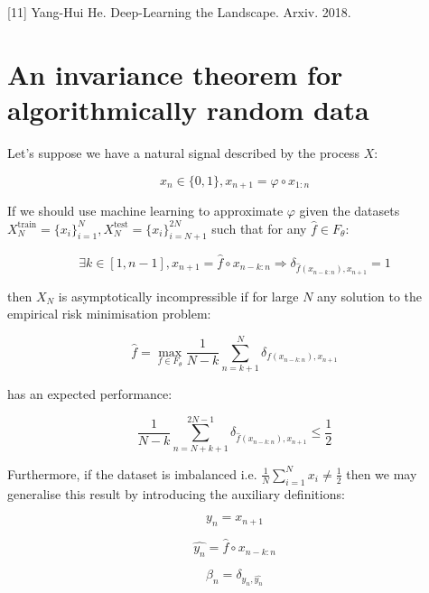 \documentclass{article}
\begin{document}
[11] Yang-Hui He. Deep-Learning the Landscape. Arxiv. 2018. 

\newpage 

\appendix

\section{An invariance theorem for algorithmically random data}

Let's suppose we have a natural signal described by the process $X$: 

\begin{equation}
x_n \in \{0,1\}, x_{n+1} = \varphi \circ x_{1:n}	
\end{equation}

If we should use machine learning to approximate $\varphi$ given the datasets 
$X_N^{\text{train}}= \{x_i\}_{i=1}^N,X_N^{\text{test}}= \{x_i\}_{i=N+1}^{2N}$
such that for any $\hat{f} \in F_{\theta}$: 

\begin{equation}
\exists k \in [1,n-1], x_{n+1} = \hat{f} \circ x_{n-k:n} \Rightarrow \delta_{\hat{f}(x_{n-k:n}),x_{n+1}} = 1	
\end{equation}

then $X_N$ is asymptotically incompressible if for large $N$ any solution to the 
empirical risk minimisation problem: 

\begin{equation}
\hat{f} = \max_{f \in F_{\theta}} \frac{1}{N-k} \sum_{n=k+1}^N \delta_{f(x_{n-k:n}),x_{n+1}}
\end{equation}

has an expected performance: 

\begin{equation}
\frac{1}{N-k} \sum_{n=N+k+1}^{2N-1} \delta_{\hat{f}(x_{n-k:n}),x_{n+1}}
 \leq \frac{1}{2}
\end{equation}

Furthermore, if the dataset is imbalanced i.e. $\frac{1}{N} \sum_{i=1}^N x_i \neq \frac{1}{2}$ then we may generalise this result by introducing the auxiliary definitions: 

\begin{equation}
y_n = x_{n+1}	
\end{equation}

\begin{equation}
\hat{y_n} = \hat{f} \circ x_{n-k:n}
\end{equation}

\begin{equation}
\beta_n = \delta_{y_n,\hat{y_n}}	
\end{equation}
\end{document}

